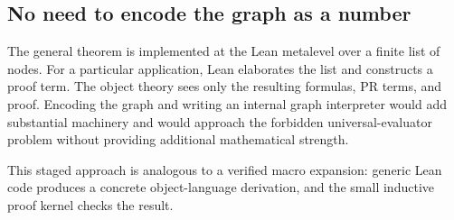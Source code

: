 \subsection{No need to encode the graph as a number}

The general theorem is implemented at the Lean metalevel over a finite list of
nodes.  For a particular application, Lean elaborates the list and constructs a
proof term.  The object theory sees only the resulting formulas, PR terms, and
proof.  Encoding the graph and writing an internal graph interpreter would add
substantial machinery and would approach the forbidden universal-evaluator
problem without providing additional mathematical strength.

This staged approach is analogous to a verified macro expansion: generic Lean
code produces a concrete object-language derivation, and the small inductive
proof kernel checks the result.
